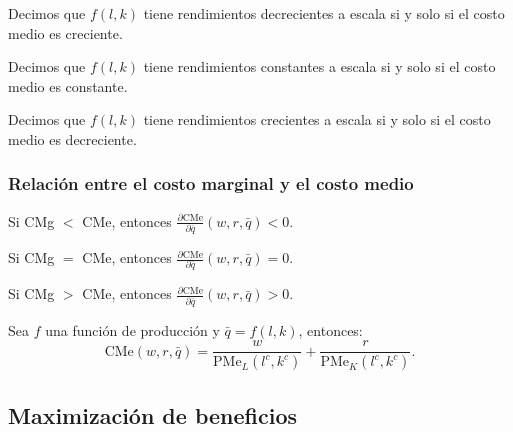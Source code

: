 \documentclass[8pt,a4paper]{extarticle}
\begin{document}
\begin{multicols}{3}
\sectionbreak

\begin{boxprop}
	Decimos que $f(l, k)$ tiene rendimientos decrecientes a escala si y solo si el costo medio es creciente.
\end{boxprop}

\begin{boxprop}                                                                                                                                  
    Decimos que $f(l, k)$ tiene rendimientos constantes a escala si y solo si el costo medio es constante.        
\end{boxprop}

\begin{boxprop}                                                                                                                                  
    Decimos que $f(l, k)$ tiene rendimientos crecientes a escala si y solo si el costo medio es decreciente.        
\end{boxprop}

\subsubsection*{Relación entre el costo marginal y el costo medio}

\begin{eqlist}
\item Si CMg $<$ CMe, entonces $\displaystyle \frac{\partial \text{CMe}}{\partial \bar{q}} (w, r, \bar{q}) < 0$.
\item Si CMg $=$ CMe, entonces $\displaystyle \frac{\partial \text{CMe}}{\partial \bar{q}} (w, r, \bar{q}) = 0$.
\item Si CMg $>$ CMe, entonces $\displaystyle \frac{\partial \text{CMe}}{\partial \bar{q}} (w, r, \bar{q}) > 0$.
\end{eqlist}

\begin{boxcor}
	Sea $f$ una función de producción y $\bar{q} = f(l, k)$, entonces:
	\[
		\text{CMe} (w, r, \bar{q}) = \frac{w}{\text{PMe}_L (l^c, k^c)} + \frac{r}{\text{PMe}_K (l^c, k^c)}
	.\] 
\end{boxcor}

\newpage

\subsection{Maximización de beneficios}


\end{multicols}
\end{document}
